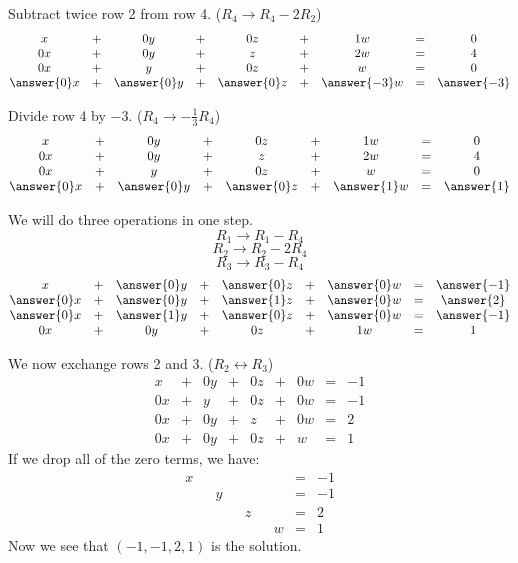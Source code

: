\documentclass{ximera}
\begin{document}
\begin{example}
\begin{prompt} Subtract twice row 2 from row 4. ($R_4\rightarrow R_4-2R_2$)
$$\begin{matrix}
      x &+ &0y&+&0z&+&1w&= &0 \\
     0x& +&0y&+&z&+&2w&=&4\\
     0x& +&y&+&0z&+&w&=&0\\
     \answer{0}x&+&\answer{0}y&+& \answer{0}z&+& \answer{-3}w&=& \answer{-3}
    \end{matrix}$$
\end{prompt}

\begin{prompt} Divide row 4 by $-3$. ($R_4\rightarrow -\frac{1}{3}R_4$)
$$\begin{matrix}
      x &+ &0y&+&0z&+&1w&= &0 \\
     0x& +&0y&+&z&+&2w&=&4\\
     0x& +&y&+&0z&+&w&=&0\\
     \answer{0}x&+&\answer{0}y&+&\answer{0}z&+& \answer{1}w&=&\answer{1}
    \end{matrix}$$
\end{prompt}   

\begin{prompt} We will do three operations in one step.
$$R_1\rightarrow R_1-R_4$$
$$R_2\rightarrow R_2-2R_4$$
$$R_3\rightarrow R_3-R_4$$
$$\begin{matrix}
      x &+ &\answer{0}y&+&\answer{0}z&+& \answer{0}w&= & \answer{-1} \\
     \answer{0}x& +&\answer{0}y&+&\answer{1}z&+& \answer{0}w&=& \answer{2}\\
     \answer{0}x& +&\answer{1}y&+&\answer{0}z&+& \answer{0}w&=& \answer{-1}\\
     0x&+&0y&+&0z&+&1w&=&1
    \end{matrix}$$
\end{prompt}   

We now exchange rows 2 and 3. ($R_2\leftrightarrow R_3$)
\begin{equation}\label{eq:sys20rref1}
\begin{array}{ccccccccc}
      x &+ &0y&+&0z&+&0w&= &-1 \\
   0x& +&y&+&0z&+&0w&=&-1\\
   0x& +&0y&+&z&+&0w&=&2\\
     0x&+&0y&+&0z&+&w&=&1
    \end{array}
    \end{equation}
    If we drop all of the zero terms, we have:
    \begin{equation}\label{eq:sys20rrefnozeros}
    \begin{array}{ccccccccc}
      x & &&&&&&= &-1 \\
   & &y&&&&&=&-1\\
   & &&&z&&&=&2\\
     &&&&&&w&=&1
    \end{array}
    \end{equation}
Now we see that $(-1, -1, 2, 1)$ is the solution.
\end{example}
 
\end{document}
